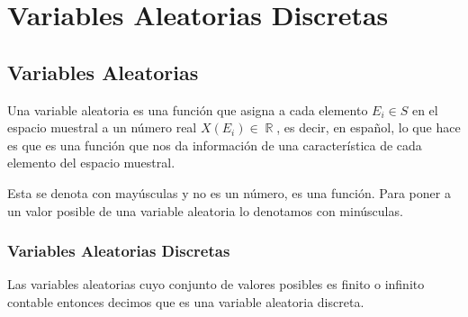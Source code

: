 \documentclass[12pt, fleqn]{report}                             %
\theoremstyle{break}                                            %
\DeclareMathOperator \Reals        {\mathbb{R}}                 %
\begin{document}
    \chapter{Variables Aleatorias Discretas}



        \clearpage
        \section{Variables Aleatorias}

            Una variable aleatoria es una función que asigna a cada elemento $E_i \in S$ en el espacio
            muestral a un número real $X(E_i) \in \Reals$, es decir, en español, lo que hace
            es que es una función que nos da información de una característica de cada elemento
            del espacio muestral.

            Esta se denota con mayúsculas y no es un número, es una función.
            Para poner a un valor posible de una variable aleatoria lo denotamos con minúsculas.

            \vspace{2em}
            \subsection{Variables Aleatorias Discretas}

                Las variables aleatorias cuyo conjunto de valores posibles es finito o infinito contable
                entonces decimos que es una variable aleatoria discreta.
\end{document}
